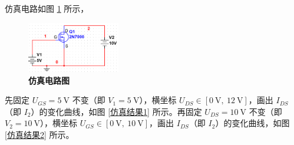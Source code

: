 \documentclass[UTF8]{report}
\theoremstyle{MyLineTheoremStyle} %
\theoremstyle{MyBlockTheoremStyle} %
\theoremstyle{MySubsubsectionStyle} %
\begin{document}
仿真电路如图 \ref{仿真电路图} 所示，

\begin{figure}[H]\centering
\includegraphics[width=0.36\textwidth]{assets/1/5c45ed5b5258df3fa8e1babac4a7ace2.png}
\caption{\textbf{仿真电路图}}\label{仿真电路图}
\end{figure}

先固定 $U_{GS} = 5\ \mathrm{V}$ 不变（即 $V_1 = 5\ \mathrm{V}$），横坐标 $U_{DS} \in [0\ \mathrm{V},\ 12\ \mathrm{V}]$，画出 $I_{DS}$（即 $I_2$）的变化曲线，如图 \ref{仿真结果1} 所示。再固定 $U_{DS} = 10\ \mathrm{V}$ 不变（即 $V_2 = 10\ \mathrm{V}$），横坐标 $U_{GS} \in [0\ \mathrm{V},\ 10\ \mathrm{V}]$，画出 $I_{DS}$（即 $I_2$）的变化曲线，如图 \ref{仿真结果2} 所示。
\end{document}
